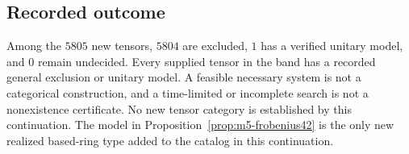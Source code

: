 \subsection{Recorded outcome}
Among the $5805$ new tensors, $5804$ are excluded, $1$ has a verified unitary model, and $0$ remain undecided.
Every supplied tensor in the band has a recorded general exclusion or unitary model.
A feasible necessary system is not a categorical construction, and a
time-limited or incomplete search is not a nonexistence certificate.
No new tensor category is established by this continuation. The model in
Proposition~\ref{prop:m5-frobenius42} is the only new realized based-ring
type added to the catalog in this continuation.
